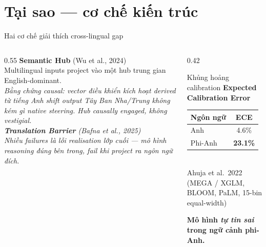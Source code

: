 \documentclass[11pt,aspectratio=169]{beamer}
\newcommand{\takeaway}[1]{%
  \begin{center}
    \colorbox{rsnavy!10}{%
      \begin{minipage}{0.92\textwidth}
        \centering\textbf{#1}
      \end{minipage}}
  \end{center}}
\begin{document}
\section{Tại sao --- cơ chế kiến trúc}

\begin{frame}{Hai cơ chế giải thích cross-lingual gap}
    \large
    \begin{columns}[T]
        \begin{column}{0.55\textwidth}
            \textbf{Semantic Hub} \scriptsize (Wu et al., 2024)\\[4pt]
            \normalsize Multilingual inputs project vào một hub trung gian English-dominant.\\[6pt]
            \footnotesize\itshape Bằng chứng causal: vector điều khiển kích hoạt derived từ tiếng Anh shift output Tây Ban Nha/Trung không kém gì native steering. Hub causally engaged, không vestigial.
            \vspace{0.4cm}\\
            \textbf{Translation Barrier} \scriptsize (Bafna et al., 2025)\\[4pt]
            \normalsize Nhiều failures là lỗi \emph{realisation lớp cuối} --- mô hình reasoning đúng bên trong, fail khi project ra ngôn ngữ đích.
        \end{column}
        \begin{column}{0.42\textwidth}
            \begin{block}{Khủng hoảng calibration}
                \centering
                \large \textbf{Expected Calibration Error}\\[6pt]
                \begin{tabular}{lc}
                    \toprule
                    \textbf{Ngôn ngữ} & \textbf{ECE} \\
                    \midrule
                    Anh        & 4.6\% \\
                    Phi-Anh    & \textcolor{rsclaret}{\textbf{23.1\%}} \\
                    \bottomrule
                \end{tabular}\\[6pt]
                \scriptsize Ahuja et al.\ 2022 (MEGA / XGLM, BLOOM, PaLM, 15-bin equal-width)
            \end{block}
            \vspace{0.2cm}
            \takeaway{Mô hình \emph{tự tin sai} trong ngữ cảnh phi-Anh.}
        \end{column}
    \end{columns}
\end{frame}
\end{document}
